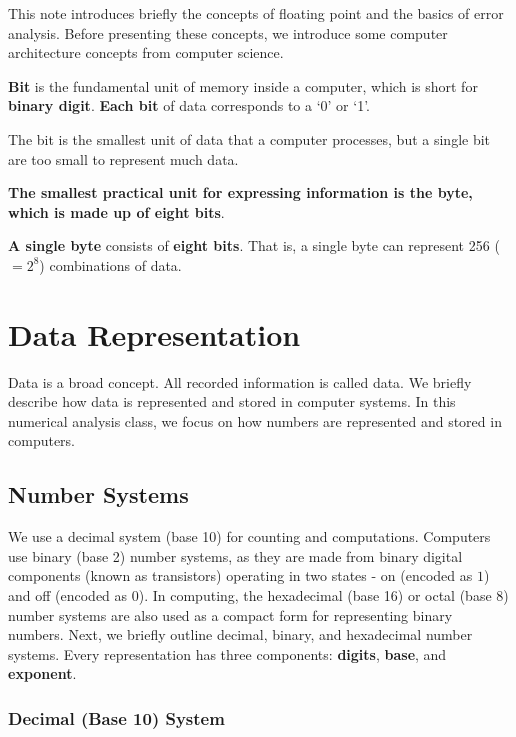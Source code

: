 \documentclass[
]{book}
\begin{document}
This note introduces briefly the concepts of floating point and the basics of error analysis. Before presenting these concepts, we introduce some computer architecture concepts from computer science.

\textbf{Bit} is the fundamental unit of memory inside a computer, which is short for \textbf{\color{red} binary digit}. \textbf{Each bit} of data corresponds to a `0' or `1'.

The bit is the smallest unit of data that a computer processes, but a single bit are too small to represent much data.

\textbf{\color{red}The smallest practical unit for expressing information is the byte, which is made up of eight bits}.

\textbf{A single byte} consists of \textbf{eight bits}. That is, a single byte can represent 256 (\(=2^8\)) combinations of data.

\hypertarget{data-representation}{%
\section{Data Representation}\label{data-representation}}

Data is a broad concept. All recorded information is called data. We briefly describe how data is represented and stored in computer systems. In this numerical analysis class, we focus on how numbers are represented and stored in computers.

\hypertarget{number-systems}{%
\subsection{Number Systems}\label{number-systems}}

We use a decimal system (base 10) for counting and computations. Computers use binary (base 2) number systems, as they are made from binary digital components (known as transistors) operating in two states - on (encoded as \(1\)) and off (encoded as \(0\)). In computing, the hexadecimal (base 16) or octal (base 8) number systems are also used as a compact form for representing binary numbers. Next, we briefly outline decimal, binary, and hexadecimal number systems. Every representation has three components: \textbf{\color{red}digits}, \textbf{\color{red}base}, and \textbf{\color{red}exponent}.

\hypertarget{decimal-base-10-system}{%
\subsubsection{Decimal (Base 10) System}\label{decimal-base-10-system}}
\end{document}
